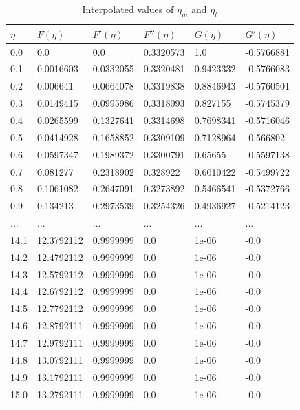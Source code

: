 \documentclass[12pt]{article}\pagestyle{myheadings}
\theoremstyle{plain}
\begin{document}
\begin{table}[ht!]
\centering
\begin{tabular} {| l | l | l | l | l | l |}
\hline
$\eta$ & $F(\eta)$ & $F'(\eta)$ & $F''(\eta)$ & $G(\eta)$ & $G'(\eta)$ \\
\hline
0.0 & 0.0 & 0.0 & 0.3320573 & 1.0 & -0.5766881 \\
0.1 & 0.0016603 & 0.0332055 & 0.3320481 & 0.9423332 & -0.5766083 \\
0.2 & 0.006641 & 0.0664078 & 0.3319838 & 0.8846943 & -0.5760501 \\
0.3 & 0.0149415 & 0.0995986 & 0.3318093 & 0.827155 & -0.5745379 \\
0.4 & 0.0265599 & 0.1327641 & 0.3314698 & 0.7698341 & -0.5716046 \\
0.5 & 0.0414928 & 0.1658852 & 0.3309109 & 0.7128964 & -0.566802 \\
0.6 & 0.0597347 & 0.1989372 & 0.3300791 & 0.65655 & -0.5597138 \\
0.7 & 0.081277 & 0.2318902 & 0.328922 & 0.6010422 & -0.5499722 \\
0.8 & 0.1061082 & 0.2647091 & 0.3273892 & 0.5466541 & -0.5372766 \\
0.9 & 0.134213 & 0.2973539 & 0.3254326 & 0.4936927 & -0.5214123 \\
... & ... & ... & ... & ... & ... \\
14.1 & 12.3792112 & 0.9999999 & 0.0 & 1e-06 & -0.0 \\
14.2 & 12.4792112 & 0.9999999 & 0.0 & 1e-06 & -0.0 \\
14.3 & 12.5792112 & 0.9999999 & 0.0 & 1e-06 & -0.0 \\
14.4 & 12.6792112 & 0.9999999 & 0.0 & 1e-06 & -0.0 \\
14.5 & 12.7792112 & 0.9999999 & 0.0 & 1e-06 & -0.0 \\
14.6 & 12.8792111 & 0.9999999 & 0.0 & 1e-06 & -0.0 \\
14.7 & 12.9792111 & 0.9999999 & 0.0 & 1e-06 & -0.0 \\
14.8 & 13.0792111 & 0.9999999 & 0.0 & 1e-06 & -0.0 \\
14.9 & 13.1792111 & 0.9999999 & 0.0 & 1e-06 & -0.0 \\
15.0 & 13.2792111 & 0.9999999 & 0.0 & 1e-06 & -0.0 \\

\hline
\end{tabular}
\caption{Interpolated values of $\eta_{m}$ and $\eta_{t}$}
\end{table}
\end{document}
